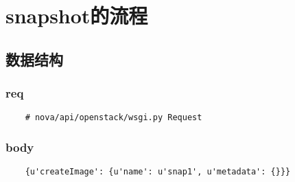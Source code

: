 \documentclass[a4paper,left=1.5cm,right=1.5cm,11pt]{article}
\begin{document}
\tableofcontents

\clearpage

\section{snapshot的流程}
\subsection{数据结构}
\subsubsection{req}
    \begin{lstlisting}
    # nova/api/openstack/wsgi.py Request
    \end{lstlisting}

\subsubsection{body}
    \begin{lstlisting}
    {u'createImage': {u'name': u'snap1', u'metadata': {}}}
    \end{lstlisting}
\end{document}
